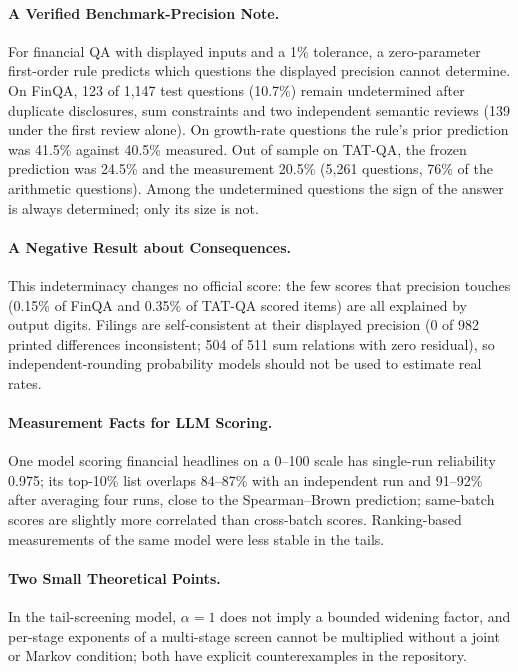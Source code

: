 \documentclass[11pt]{article}
\begin{document}
\paragraph{A Verified Benchmark-Precision Note.} For financial QA with displayed inputs and a 1\% tolerance, a zero-parameter first-order rule predicts which questions the displayed precision cannot determine. On FinQA, 123 of 1,147 test questions (10.7\%) remain undetermined after duplicate disclosures, sum constraints and two independent semantic reviews (139 under the first review alone). On growth-rate questions the rule's prior prediction was 41.5\% against 40.5\% measured. Out of sample on TAT-QA, the frozen prediction was 24.5\% and the measurement 20.5\% (5,261 questions, 76\% of the arithmetic questions). Among the undetermined questions the sign of the answer is always determined; only its size is not.

\paragraph{A Negative Result about Consequences.} This indeterminacy changes no official score: the few scores that precision touches (0.15\% of FinQA and 0.35\% of TAT-QA scored items) are all explained by output digits. Filings are self-consistent at their displayed precision (0 of 982 printed differences inconsistent; 504 of 511 sum relations with zero residual), so independent-rounding probability models should not be used to estimate real rates.

\paragraph{Measurement Facts for LLM Scoring.} One model scoring financial headlines on a 0--100 scale has single-run reliability 0.975; its top-10\% list overlaps 84--87\% with an independent run and 91--92\% after averaging four runs, close to the Spearman--Brown prediction; same-batch scores are slightly more correlated than cross-batch scores. Ranking-based measurements of the same model were less stable in the tails.

\paragraph{Two Small Theoretical Points.} In the tail-screening model, $\alpha=1$ does not imply a bounded widening factor, and per-stage exponents of a multi-stage screen cannot be multiplied without a joint or Markov condition; both have explicit counterexamples in the repository.
\end{document}
